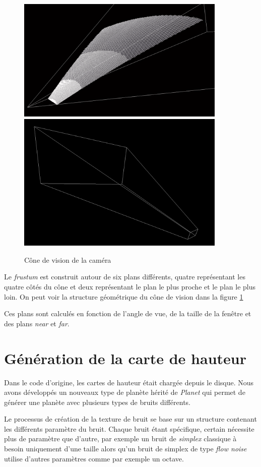   \begin{figure}
  \centering
  \includegraphics[width=10cm]{img/culling.png}
  \includegraphics[width=10cm]{img/frustumbox.png}
  \caption{Cône de vision de la caméra \protect\footnotemark}
  \label{fig:culling}
  \end{figure}

 
  Le \textit{frustum} est construit autour de six plans différents, quatre représentant les quatre côtés du cône et deux représentant le plan le plus proche et le plan le plus loin.
  On peut voir la structure géométrique du cône de vision dans la figure \ref{fig:culling}
  
  Ces plans sont calculés en fonction de l'angle de vue, de la taille de la fenêtre et des plans \textit{near} et \textit{far}.
  
  \section{Génération de la carte de hauteur}
  
  Dans le code d'origine, les cartes de hauteur était chargée depuis le disque. Nous avons développés un nouveaux type de planète hérité de \textit{Planet} qui permet de générer une planète avec plusieurs types de bruits différents.
  
  Le processus de création de la texture de bruit se base sur un structure contenant les différents paramètre du bruit.
  Chaque bruit étant spécifique, certain nécessite plus de paramètre que d'autre, par exemple un bruit de \textit{simplex} classique à besoin uniquement d'une taille alors qu'un bruit
  de simplex de type \textit{flow noise} utilise d'autres paramètres comme par exemple un octave. 